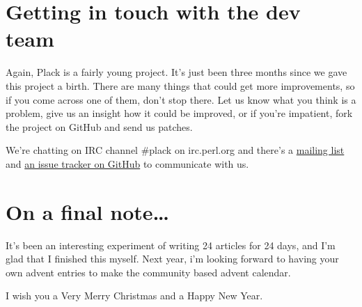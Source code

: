 \section{Getting in touch with the dev
team}\label{getting-in-touch-with-the-dev-team}

Again, Plack is a fairly young project. It's just been three months since we
gave this project a birth. There are many things that could get more
improvements, so if you come across one of them, don't stop there. Let
us know what you think is a problem, give us an insight how it could be
improved, or if you're impatient, fork the project on GitHub and send us
patches.

We're chatting on IRC channel \#plack on irc.perl.org and there's a
\href{http://groups.google.com/group/psgi-plack}{mailing list} and
\href{http://github.com/plack/Plack/issues}{an issue tracker on GitHub}
to communicate with us.

\section{On a final note\ldots{}}\label{on-a-final-note}

It's been an interesting experiment of writing 24 articles for 24 days,
and I'm glad that I finished this myself. Next year, i'm looking forward
to having your own advent entries to make the community based advent
calendar.

I wish you a Very Merry Christmas and a Happy New Year.
